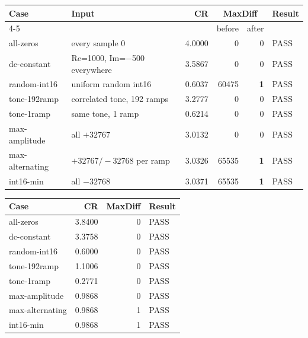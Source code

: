 \documentclass[10pt,a4paper]{article}
\newcommand{\tno}[1]{\textbf{#1}}
\begin{document}
\begin{center}
\begin{minipage}{0.98\textwidth}\centering
{}
\centering\small
\begin{tabular}{@{}llrrrl@{}}
\toprule
Case & Input & CR & \multicolumn{2}{c}{MaxDiff} & Result\\
\cmidrule(lr){4-5}
 & & & before & after & \\
\midrule
all-zeros       & every sample 0                & 4.0000 & 0 & 0 & PASS\\
dc-constant     & Re=1000, Im=$-$500 everywhere & 3.5867 & 0 & 0 & PASS\\
random-int16    & uniform random int16          & 0.6037 & \textcolor{warm}{60475} & \tno{1} & PASS\\
tone-192ramp    & correlated tone, 192 ramps    & 3.2777 & 0 & 0 & PASS\\
tone-1ramp      & same tone, 1 ramp             & 0.6214 & 0 & 0 & PASS\\
max-amplitude   & all $+32767$                  & 3.0132 & 0 & 0 & PASS\\
max-alternating & $+32767 / -32768$ per ramp    & 3.0326 & \textcolor{warm}{65535} & \tno{1} & PASS\\
int16-min       & all $-32768$                  & 3.0371 & \textcolor{warm}{65535} & \tno{1} & PASS\\
\bottomrule
\end{tabular}
\end{minipage}
\end{center}

\begin{center}
\begin{minipage}{0.98\textwidth}\centering
{}
\centering\small
\begin{tabular}{@{}lrrl@{}}
\toprule
Case & CR & MaxDiff & Result\\
\midrule
all-zeros       & 3.8400 & 0 & PASS\\
dc-constant     & 3.3758 & 0 & PASS\\
random-int16    & 0.6000 & 0 & PASS\\
tone-192ramp    & 1.1006 & 0 & PASS\\
tone-1ramp      & 0.2771 & 0 & PASS\\
max-amplitude   & 0.9868 & 0 & PASS\\
max-alternating & 0.9868 & 1 & PASS\\
int16-min       & 0.9868 & 1 & PASS\\
\bottomrule
\end{tabular}
\end{minipage}
\end{center}
\end{document}
